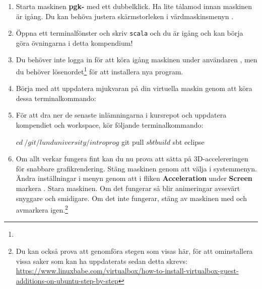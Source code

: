 \begin{enumerate}
\item Starta maskinen \textbf{pgk-\VMName} med ett dubbelklick. Ha lite tålamod innan maskinen är igång. Du kan behöva justera skärmstorleken i värdmaskinsmenyn .

\item Öppna ett terminalfönster och skriv \texttt{scala} och du är igång och kan börja göra övningarna i detta kompendium!

\item Du behöver inte logga in för att köra igång maskinen under användaren , men du  behöver lösenordet\footnote{} för att installera nya program.

\item Börja med att uppdatera mjukvaran på din virtuella maskin genom att köra dessa terminalkommando:


\item För att dra ner de senaste inlämningarna i kursrepot och uppdatera kompendiet och workspace, kör följande terminalkommando:
\begin{REPLnonum}
$ cd ~/git/lunduniversity/introprog
$ git pull
$ sbt build
$ sbt eclipse
\end{REPLnonum}

\item Om allt verkar fungera fint kan du nu prova att sätta på 3D-accelereringen för snabbare grafikrendering. Stäng maskinen genom att välja  i systemmenyn. Ändra inställningar i menyn  genom att i fliken \textbf{Acceleration} under \textbf{Screen} markera . Stara maskinen. Om det fungerar så blir animeringar avsevärt snyggare och smidigare. Om det inte fungerar, stäng av maskinen med  och avmarkera  igen.\footnote{Du kan också prova att genomföra stegen som visas här, för att ominstallera vissa saker som kan ha uppdaterats sedan detta skrevs: \url{https://www.linuxbabe.com/virtualbox/how-to-install-virtualbox-guest-additions-on-ubuntu-step-by-step}}

\end{enumerate}